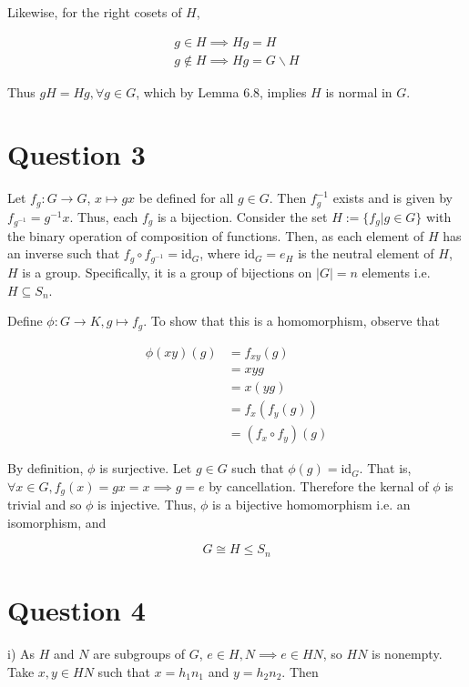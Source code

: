 \documentclass{article}
\begin{document}
Likewise, for the right cosets of $H$,

\begin{align*}
    g \in H \implies Hg = H\\
    g \notin H \implies Hg = G\backslash H
\end{align*}

Thus $gH = Hg, \forall g \in G$, which by Lemma 6.8, implies $H$ is normal in $G$.

\section*{Question 3}

Let $f_g:G \to G$, $x \mapsto gx$ be defined for all $g \in G$. Then $f_g^{-1}$ exists and is given by $f_{g^{-1}} = g^{-1}x$. Thus,
each $f_g$ is a bijection. Consider the set $H := \{f_g | g \in G\}$ with the binary operation of composition of functions. Then,
as each element of $H$ has an inverse such that $f_g\circ f_{g^{-1}} = \text{id}_G$, where $\text{id}_G = e_H$ is the neutral element
of $H$, $H$ is a group. Specifically, it is a group of bijections on $|G| = n$ elements i.e. $H \subseteq S_n$.

\hfill \break
Define $\phi:G \to K, g \mapsto f_g$. To show that this is a homomorphism, observe that

\begin{align*}
    \phi(xy)(g) &= f_{xy}(g)\\
    &= xyg\\
    &= x(yg)\\
    &=f_x(f_y(g))\\
    &= (f_x \circ f_y)(g)
\end{align*}

By definition, $\phi$ is surjective. Let $g \in G$ such that $\phi(g) = \text{id}_G$. That is,
$\forall x \in G, f_g(x) = gx = x \implies g = e$ by cancellation. Therefore the kernal of $\phi$ is trivial and so $\phi$ is injective.
Thus, $\phi$ is a bijective homomorphism i.e. an isomorphism, and

\begin{equation*}
    G \cong H \leq S_n
\end{equation*}

\section*{Question 4}

i) As $H$ and $N$ are subgroups of $G$, $e \in H, N \implies e \in HN$, so $HN$ is nonempty. Take $x, y \in HN$ such that
$x = h_1n_1$ and $y = h_2n_2$. Then
\end{document}
